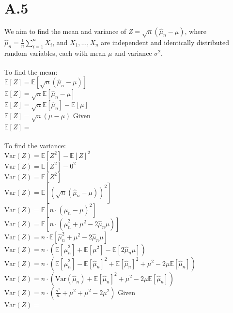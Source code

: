 \documentclass{article}
\newcommand{\1}{\mathbf{1}}
\newcommand{\E}{\mathbb{E}}
\begin{document}
\section*{A.5}
{\Large 
We aim to find the mean and variance of $Z = \sqrt{n}(\widehat{\mu}_n - \mu)$, where $\widehat{\mu}_n = \frac{1}{n} \sum_{i=1}^n X_i$, and $X_1,\dots,X_n$ are independent and identically distributed random variables, each with mean $\mu$ and variance $\sigma^2$. \\ \\
To find the mean: \\
$\E[Z] = \E[\sqrt{n}(\widehat{\mu}_n - \mu)]$ \\
$\E[Z] = \sqrt{n}\E[\widehat{\mu}_n - \mu]$ \\
$\E[Z] = \sqrt{n}\E[\widehat{\mu}_n] - \E[\mu]$ \\
$\E[Z] = \sqrt{n}(\mu - \mu)$ \hfill Given \\
$\E[Z] = $  \\ \\
To find the variance: \\
$\text{Var}(Z) = \E[Z^2] - \E[Z]^2$ \\
$\text{Var}(Z) = \E[Z^2] - 0^2$ \\
$\text{Var}(Z) = \E[Z^2]$ \\
$\text{Var}(Z) = \E[(\sqrt{n}(\widehat{\mu}_n - \mu))^2]$ \\
$\text{Var}(Z) = \E[n \cdot (\widehat{\mu}_n - \mu)^2]$ \\
$\text{Var}(Z) = \E[n \cdot (\widehat{\mu}_n^2 + \mu^2 - 2\widehat{\mu}_n \mu)]$ \\
$\text{Var}(Z) = n \cdot \E[\widehat{\mu}_n^2 + \mu^2 - 2\widehat{\mu}_n \mu]$ \\
$\text{Var}(Z) = n \cdot (\E[\widehat{\mu}_n^2] + \E[\mu^2] - \E[2\widehat{\mu}_n \mu])$ \\
$\text{Var}(Z) = n \cdot (\E[\widehat{\mu}_n^2] - \E[\widehat{\mu}_n]^2 + \E[\widehat{\mu}_n]^2 + \mu^2 - 2\mu\E[\widehat{\mu}_n])$ \\
$\text{Var}(Z) = n \cdot (\text{Var}(\widehat{\mu}_n) + \E[\widehat{\mu}_n]^2 + \mu^2 - 2\mu\E[\widehat{\mu}_n])$ \\
$\text{Var}(Z) = n \cdot (\frac{\sigma^2}{n} + \mu^2 + \mu^2 - 2\mu^2)$ \hfill Given \\
$\text{Var}(Z) = $ 

}
\end{document}
